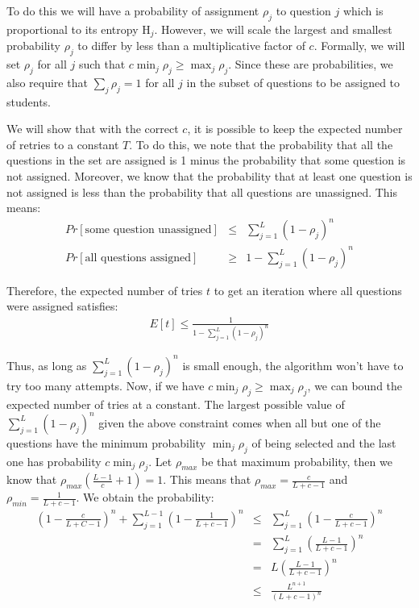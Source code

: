 \documentclass[psamsfonts]{amsart}
\begin{document}
To do this we will have a probability of assignment $\rho_j$ to question $j$ which is proportional to its entropy $\mathrm{H}_j$. However, we will scale the largest and smallest probability $\rho_j$ to differ by less than a multiplicative factor of $c$. Formally, we will set $\rho_j$ for all $j$ such that $c \min_j \rho_j \geq \max_j \rho_j$. Since these are probabilities, we also require that $\sum_{j} \rho_j = 1$ for all $j$ in the subset of questions to be assigned to students. 

We will show that with the correct $c$, it is possible to keep the expected number of retries to a constant $T$. To do this, we note that the probability that all the questions in the set are assigned is 1 minus the probability that some question is not assigned. Moreover, we know that the probability that at least one question is not assigned is less than the probability that all questions are unassigned. This means:
\begin{eqnarray}
Pr[\text{some question unassigned}] &\leq& \sum_{j=1}^L (1- \rho_j)^n \\
Pr[\text{all questions assigned}] &\geq& 1 - \sum_{j=1}^L (1 - \rho_j)^n 
\end{eqnarray}

Therefore, the expected number of tries $t$ to get an iteration where all questions were assigned satisfies:
\begin{eqnarray}
E[t] \leq \frac{1}{1 - \sum_{j=1}^L (1 - \rho_j)^n}
\end{eqnarray}

Thus, as long as $\sum_{j=1}^L (1 - \rho_j)^n$ is small enough, the algorithm won't have to try too many attempts. Now, if we have $c \min_j \rho_j \geq \max_j \rho_j$, we can bound the expected number of tries at a constant. The largest possible value of $\sum_{j=1}^L (1- \rho_j)^n$ given the above constraint comes when all but one of the questions have the minimum probability $\min_j \rho_j$ of being selected and the last one has probability $c \min_j \rho_j$. Let $\rho_{max}$ be that maximum probability, then we know that $\rho_{max}\left( \frac{L-1}{c} + 1 \right) = 1$. This means that $\rho_{max} = \frac{c}{L + c - 1}$ and $\rho_{min} = \frac{1}{L + c - 1}$. We obtain the probability:
\begin{eqnarray}
\left(1- \frac{c}{L+C-1} \right)^n + \sum_{j=1}^{L-1} \left(1 - \frac{1}{L+c-1} \right)^n &\leq& \sum_{j=1}^L \left( 1 - \frac{c}{L + c-1} \right)^n \\
&=& \sum_{j=1}^L \left( \frac{L-1}{L+c-1} \right)^n \\
&=& L \left( \frac{L-1}{L+c-1} \right)^n \\
&\leq& \frac{L^{n+1}}{(L+c-1)^n}
\end{eqnarray}
\end{document}
